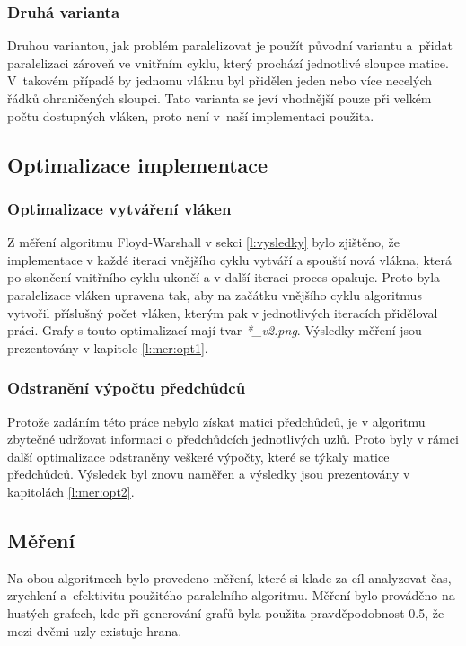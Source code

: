 \subsubsection{Druhá varianta}
Druhou variantou, jak problém paralelizovat je použít původní variantu a~přidat paralelizaci zároveň ve vnitřním cyklu, který prochází jednotlivé sloupce matice. V~takovém případě by jednomu vláknu byl přidělen jeden nebo více necelých řádků ohraničených sloupci. Tato varianta se jeví vhodnější pouze při velkém počtu dostupných vláken, proto není v~naší implementaci použita.

\subsection{Optimalizace implementace}
\subsubsection{Optimalizace vytváření vláken} \label{l:opt1}
Z měření algoritmu Floyd-Warshall v sekci \ref{l:vysledky} bylo zjištěno, že implementace v každé iteraci vnějšího cyklu vytváří a spouští nová vlákna, která po skončení vnitřního cyklu ukončí a v další iteraci proces opakuje. Proto byla paralelizace vláken upravena tak, aby na začátku vnějšího cyklu algoritmus vytvořil příslušný počet vláken, kterým pak v jednotlivých iteracích přiděloval práci. Grafy s touto optimalizací mají tvar \textit{*\_v2.png}. Výsledky měření jsou prezentovány v kapitole \ref{l:mer:opt1}.

\subsubsection{Odstranění výpočtu předchůdců} \label{l:opt2}
Protože zadáním této práce nebylo získat matici předchůdců, je v algoritmu zbytečné udržovat informaci o předchůdcích jednotlivých uzlů. Proto byly v rámci další optimalizace odstraněny veškeré výpočty, které se týkaly matice předchůdců. Výsledek byl znovu naměřen a výsledky jsou prezentovány v kapitolách \ref{l:mer:opt2}.


\subsection{Měření}
Na obou algoritmech bylo provedeno měření, které si klade za cíl analyzovat čas, zrychlení a~efektivitu použitého paralelního algoritmu. Měření bylo prováděno na hustých grafech, kde při generování grafů byla použita pravděpodobnost 0.5, že mezi dvěmi uzly existuje hrana.

